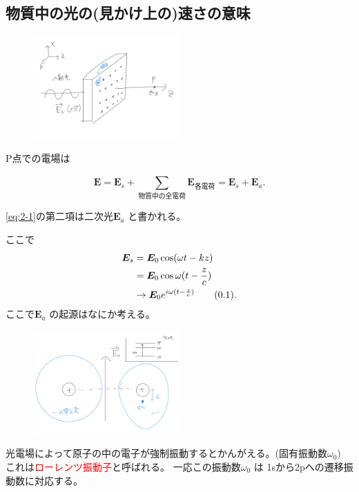 \documentclass[dvipdfmx,12pt]{jsarticle}
\def\theequation{\thesection.\arabic{equation}}
\begin{document}
\subsection{物質中の光の(見かけ上の)速さの意味}
\begin{figure}[H]
	\centering
	\includegraphics[width=0.5\textwidth]{fig2/Fig-3.jpg}
	\label{fig:fig2-Fig-3-jpg}
\end{figure}
P点での電場は
\begin{tcolorbox}[colback=green!10!white]
\begin{equation}
\label{eq:2-1}
\bm{E}=\bm{E}_s+\sum_{\text{物質中の全電荷}}^{} \bm{E}_{\text{各電荷}}=\bm{E}_s+\bm{E}_a
.\end{equation}
\end{tcolorbox}
\eqref{eq:2-1}の第二項は二次光$\bm{E}_a$ と書かれる。

ここで
\begin{align*}
	\label{eq:2-2}
	\bm{E}_s&= \bm{E}_0 \cos (\omega t-kz) \\
	&= \bm{E}_0 \cos \omega(t-\frac{z}{c}) \\
	&\to  \bm{E}_0e^{i\omega(t-\frac{z}{c})} 
	\stepcounter{equation}\tag{\theequation} 
.\end{align*}
ここで$\bm{E}_a$ の起源はなにか考える。
\begin{figure}[H]
	\centering
	\includegraphics[width=0.5\textwidth]{fig2/Fig-4.jpg}
	\label{fig:fig2-Fig-4-jpg}
\end{figure}
光電場によって原子の中の電子が強制振動するとかんがえる。(固有振動数$\omega_0$)
これは\textcolor{red}{ローレンツ振動子}と呼ばれる。
一応この振動数$\omega_0$ は 1sから2pへの遷移振動数に対応する。
\end{document}

